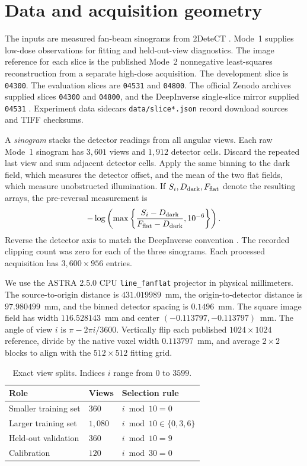 \documentclass[11pt]{article}
\begin{document}
\section{Data and acquisition geometry}
\label{sec:ct-data}

The inputs are measured fan-beam sinograms from 2DeteCT \cite{detect}. Mode~1 supplies low-dose observations for fitting and held-out-view diagnostics. The image reference for each slice is the published Mode~2 nonnegative least-squares reconstruction from a separate high-dose acquisition. The development slice is \texttt{04300}. The evaluation slices are \texttt{04531} and \texttt{04800}. The official Zenodo archives supplied slices \texttt{04300} and \texttt{04800}, and the DeepInverse single-slice mirror supplied \texttt{04531} \cite{deepinv}. Experiment data sidecars \texttt{data/slice*.json} record download sources and TIFF checksums.

A \emph{sinogram} stacks the detector readings from all angular views. Each raw Mode~1 sinogram has \(3{,}601\) views and \(1{,}912\) detector cells. Discard the repeated last view and sum adjacent detector cells. Apply the same binning to the dark field, which measures the detector offset, and the mean of the two flat fields, which measure unobstructed illumination. If \(S_i,D_{\rm dark},F_{\rm flat}\) denote the resulting arrays, the pre-reversal measurement is
\[
  -\log\left(\max\left\{\frac{S_i-D_{\rm dark}}{F_{\rm flat}-D_{\rm dark}},10^{-6}\right\}\right).
\]
Reverse the detector axis to match the DeepInverse convention \cite{deepinv}. The recorded clipping count was zero for each of the three sinograms. Each processed acquisition has \(3{,}600\times956\) entries.

We use the ASTRA 2.5.0 CPU \texttt{line\_fanflat} projector in physical millimeters. The source-to-origin distance is \(431.019989\)~mm, the origin-to-detector distance is \(97.980499\)~mm, and the binned detector spacing is \(0.1496\)~mm. The square image field has width \(116.528143\)~mm and center \((-0.113797,-0.113797)\)~mm. The angle of view \(i\) is \(\pi-2\pi i/3600\). Vertically flip each published \(1024\times1024\) reference, divide by the native voxel width \(0.113797\)~mm, and average \(2\times2\) blocks to align with the \(512\times512\) fitting grid.

\begin{table}[htbp]
  \centering
  \caption{Exact view splits. Indices \(i\) range from \(0\) to \(3599\).}
  \label{tab:ct-splits}
  \begin{tabular}{@{}lll@{}}
    \toprule
    Role & Views & Selection rule \\
    \midrule
    Smaller training set & \(360\) & \(i\bmod 10=0\) \\
    Larger training set & \(1{,}080\) & \(i\bmod 10\in\{0,3,6\}\) \\
    Held-out validation & \(360\) & \(i\bmod 10=9\) \\
    Calibration & \(120\) & \(i\bmod 30=0\) \\
    \bottomrule
  \end{tabular}
\end{table}
\end{document}
